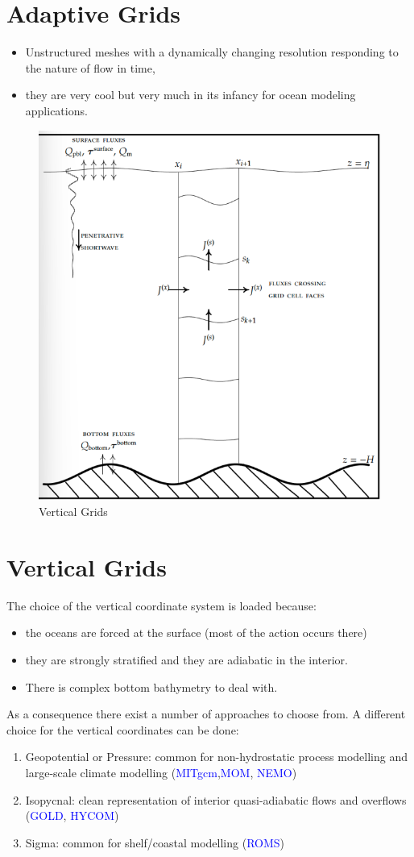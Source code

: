 \section{Adaptive Grids}
\begin{itemize}
	\item Unstructured meshes with a dynamically changing resolution responding to the nature of flow in time,
	\item they are very cool but very much in its infancy for ocean modeling applications.
\end{itemize}
\begin{figure}[htp!]
	\centering
	\includegraphics[width=0.40\linewidth]{uploads/Screenshot 2024-11-21 235405.png}
	\caption{Vertical Grids}
	\label{fig:vertical grids}
\end{figure}
\section{Vertical Grids}
The choice of the vertical coordinate system is loaded because:
\begin{itemize}
	\item the oceans are forced at the surface (most of the action occurs there)
	\item they are strongly stratified and they are adiabatic in the interior.
	\item There is complex bottom bathymetry to deal with.
\end{itemize}
As a consequence there exist a number of approaches to choose from. A different choice for the vertical coordinates can be done:
\begin{enumerate}
	\item Geopotential or Pressure: common for non-hydrostatic process modelling and large-scale climate modelling (\textcolor{Blue}{MITgcm},\textcolor{Blue}{MOM}, \textcolor{Blue}{NEMO})
	\item Isopycnal:  clean representation of interior quasi-adiabatic flows and overflows (\textcolor{Blue}{GOLD}, \textcolor{Blue}{HYCOM})
	\item Sigma: common for shelf/coastal modelling (\textcolor{Blue}{ROMS})
\end{enumerate}

